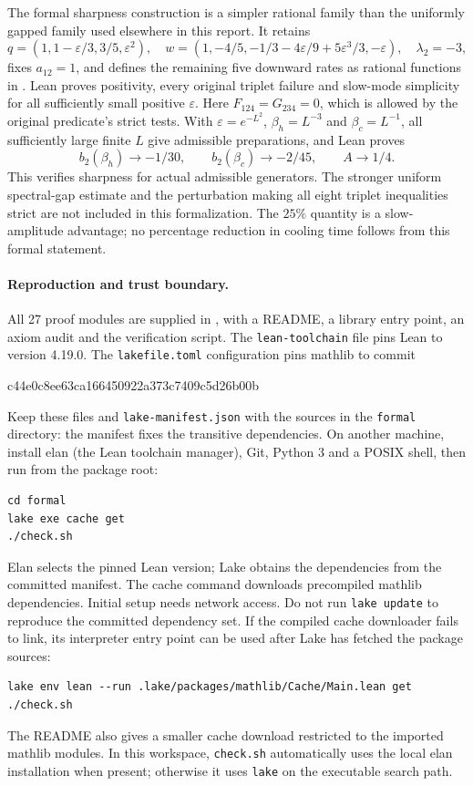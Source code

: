 \documentclass[11pt]{article}
\begin{document}
The formal sharpness construction is a simpler rational family than the
uniformly gapped family used elsewhere in this report. It retains
\[
 q=(1,1-\varepsilon/3,3/5,\varepsilon^2),\quad
 w=(1,-4/5,-1/3-4\varepsilon/9+5\varepsilon^3/3,-\varepsilon),
 \quad\lambda_2=-3,
\]
fixes $a_{12}=1$, and defines the remaining five downward rates as rational
functions in .
Lean proves positivity, every original triplet failure and slow-mode
simplicity for all sufficiently small positive $\varepsilon$.
Here $F_{124}=G_{234}=0$, which is allowed by the original predicate's
strict tests. With $\varepsilon=e^{-L^2}$, $\beta_h=L^{-3}$ and
$\beta_c=L^{-1}$, all sufficiently large finite $L$ give admissible
preparations, and Lean proves
\[
 b_2(\beta_h)\longrightarrow-1/30,\qquad
 b_2(\beta_c)\longrightarrow-2/45,\qquad A\longrightarrow1/4.
\]
This verifies sharpness for actual admissible generators. The stronger
uniform spectral-gap estimate and the perturbation making all eight triplet
inequalities strict are not included in this formalization. The $25\%$
quantity is a slow-amplitude advantage; no percentage reduction in cooling
time follows from this formal statement.

\paragraph{Reproduction and trust boundary.}
All 27 proof modules are supplied in , with a README, a
library entry point, an axiom audit and the verification script.
The \texttt{lean-toolchain} file pins Lean to version 4.19.0. The
\texttt{lakefile.toml} configuration pins mathlib to commit
\begin{center}\ttfamily
c44e0c8ee63ca166450922a373c7409c5d26b00b
\end{center}
Keep these files and \texttt{lake-manifest.json} with the sources in the
\texttt{formal} directory: the manifest fixes the transitive dependencies.
On another machine, install elan (the Lean toolchain manager), Git, Python 3
and a POSIX shell, then run from the package root:
\begin{verbatim}
cd formal
lake exe cache get
./check.sh
\end{verbatim}
Elan selects the pinned Lean version; Lake obtains the dependencies from
the committed manifest. The cache command downloads precompiled mathlib
dependencies. Initial setup needs network access. Do not run
\texttt{lake update} to reproduce the committed dependency set.
If the compiled cache downloader fails to link, its interpreter entry point
can be used after Lake has fetched the package sources:
\begin{verbatim}
lake env lean --run .lake/packages/mathlib/Cache/Main.lean get
./check.sh
\end{verbatim}
The README also gives a smaller cache download restricted to the imported
mathlib modules. In this workspace, \texttt{check.sh} automatically uses
the local elan installation when present; otherwise it uses \texttt{lake}
on the executable search path.
\end{document}
